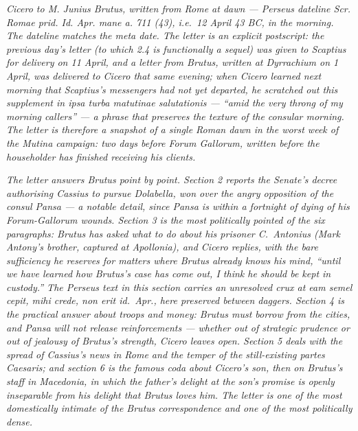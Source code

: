 
\textit{Cicero to M. Junius Brutus, written from Rome at
dawn --- Perseus dateline \textit{Scr. Romae prid. Id.
Apr. mane a. 711 (43)}, i.e.\ 12 April 43 BC, in the
morning. The dateline matches the meta date. The letter
is an explicit postscript: the previous day's letter (to
which 2.4 is functionally a sequel) was given to Scaptius
for delivery on 11 April, and a letter from Brutus,
written at Dyrrachium on 1 April, was delivered to
Cicero that same evening; when Cicero learned next
morning that Scaptius's messengers had not yet
departed, he scratched out this supplement \textit{in
ipsa turba matutinae salutationis} --- ``amid the very
throng of my morning callers'' --- a phrase that
preserves the texture of the consular morning. The
letter is therefore a snapshot of a single Roman dawn
in the worst week of the Mutina campaign: two days
before Forum Gallorum, written before the householder
has finished receiving his clients.}

\textit{The letter answers Brutus point by point. Section
2 reports the Senate's decree authorising Cassius to
pursue Dolabella, won over the angry opposition of the
consul Pansa --- a notable detail, since Pansa is
within a fortnight of dying of his Forum-Gallorum wounds.
Section 3 is the most politically pointed of the
six paragraphs: Brutus has asked what to do about his
prisoner C.\ Antonius (Mark Antony's brother, captured
at Apollonia), and Cicero replies, with the bare
sufficiency he reserves for matters where Brutus
already knows his mind, ``until we have learned how
Brutus's case has come out, I think he should be kept in
custody.'' The Perseus text in this section carries an
unresolved crux at \textit{eam semel cepit, mihi crede,
non erit id.\ Apr.}, here preserved between daggers.
Section 4 is the practical answer about troops and
money: Brutus must borrow from the cities, and Pansa
will not release reinforcements --- whether out of
strategic prudence or out of jealousy of Brutus's
strength, Cicero leaves open. Section 5 deals with the
spread of Cassius's news in Rome and the temper of
the still-existing \textit{partes Caesaris}; and section
6 is the famous coda about Cicero's son, then on
Brutus's staff in Macedonia, in which the father's
delight at the son's promise is openly inseparable
from his delight that Brutus loves him. The letter is
one of the most domestically intimate of the Brutus
correspondence and one of the most politically dense.}
